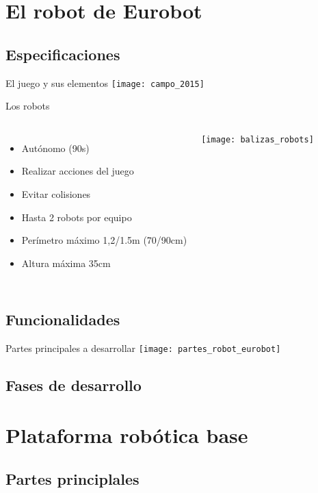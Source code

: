 \documentclass{beamer}
\begin{document}
\section{El robot de Eurobot}
\subsection{Especificaciones}

\begin{frame}{El juego y sus elementos}
\texttt{[image: campo\_2015]}
\end{frame}

\begin{frame}{Los robots}
\begin{columns}

\begin{itemize}
\item Autónomo (90s)
\item Realizar acciones del juego
\item Evitar colisiones
\item Hasta 2 robots por equipo
\item Perímetro máximo 1,2/1.5m (70/90cm)
\item Altura máxima 35cm
\end{itemize}

\centering
\texttt{[image: balizas\_robots]}
\end{columns}
\end{frame}


\subsection{Funcionalidades}

\begin{frame}{Partes principales a desarrollar}
\texttt{[image: partes\_robot\_eurobot]}
\end{frame}


\subsection{Fases de desarrollo}


\section{Plataforma robótica base}
\subsection{Partes principlales}
\end{document}
